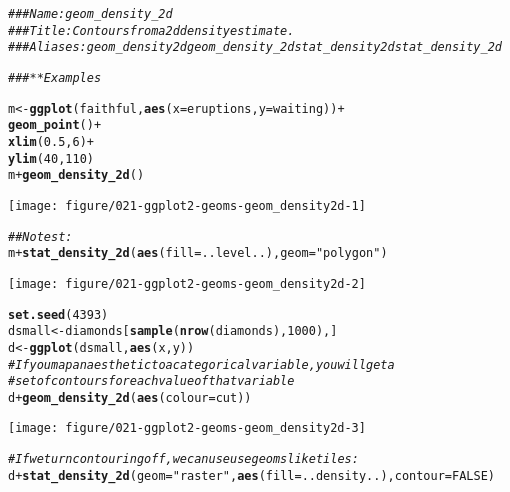 \documentclass[a4paper,titlepage]{tufte-handout}\usepackage[]{graphicx}\usepackage[]{color}
\makeatletter
\def\maxwidth{ %
  \ifdim\Gin@nat@width>\linewidth
    \linewidth
  \else
    \Gin@nat@width
  \fi
}
\newcommand{\hlnum}[1]{\textcolor[rgb]{0.686,0.059,0.569}{#1}}%
\newcommand{\hlstr}[1]{\textcolor[rgb]{0.192,0.494,0.8}{#1}}%
\newcommand{\hlcom}[1]{\textcolor[rgb]{0.678,0.584,0.686}{\textit{#1}}}%
\newcommand{\hlopt}[1]{\textcolor[rgb]{0,0,0}{#1}}%
\newcommand{\hlstd}[1]{\textcolor[rgb]{0.345,0.345,0.345}{#1}}%
\newcommand{\hlkwb}[1]{\textcolor[rgb]{0.69,0.353,0.396}{#1}}%
\newcommand{\hlkwc}[1]{\textcolor[rgb]{0.333,0.667,0.333}{#1}}%
\newcommand{\hlkwd}[1]{\textcolor[rgb]{0.737,0.353,0.396}{\textbf{#1}}}%
\newenvironment{kframe}{%
 \def\at@end@of@kframe{}%
 \ifinner\ifhmode%
  \def\at@end@of@kframe{\end{minipage}}%
  \begin{minipage}{\columnwidth}%
 \fi\fi%
 \def\FrameCommand##1{\hskip\@totalleftmargin \hskip-\fboxsep
 \colorbox{shadecolor}{##1}\hskip-\fboxsep
     \hskip-\linewidth \hskip-\@totalleftmargin \hskip\columnwidth}%
 \MakeFramed {\advance\hsize-\width
   \@totalleftmargin\z@ \linewidth\hsize
   \@setminipage}}%
 {\par\unskip\endMakeFramed%
 \at@end@of@kframe}
\newenvironment{knitrout}{}{} %
\makeatother
\begin{document}
\begin{knitrout}
\color{fgcolor}\begin{kframe}
\begin{alltt}
\hlcom{### Name: geom_density_2d}
\hlcom{### Title: Contours from a 2d density estimate.}
\hlcom{### Aliases: geom_density2d geom_density_2d stat_density2d stat_density_2d}

\hlcom{### ** Examples}

\hlstd{m} \hlkwb{<-} \hlkwd{ggplot}\hlstd{(faithful,} \hlkwd{aes}\hlstd{(}\hlkwc{x} \hlstd{= eruptions,} \hlkwc{y} \hlstd{= waiting))} \hlopt{+}
 \hlkwd{geom_point}\hlstd{()} \hlopt{+}
 \hlkwd{xlim}\hlstd{(}\hlnum{0.5}\hlstd{,} \hlnum{6}\hlstd{)} \hlopt{+}
 \hlkwd{ylim}\hlstd{(}\hlnum{40}\hlstd{,} \hlnum{110}\hlstd{)}
\hlstd{m} \hlopt{+} \hlkwd{geom_density_2d}\hlstd{()}
\end{alltt}
\end{kframe}
\texttt{[image: figure/021-ggplot2-geoms-geom\_density2d-1]} 
\begin{kframe}\begin{alltt}
\hlcom{## No test: }
\hlstd{m} \hlopt{+} \hlkwd{stat_density_2d}\hlstd{(}\hlkwd{aes}\hlstd{(}\hlkwc{fill} \hlstd{= ..level..),} \hlkwc{geom} \hlstd{=} \hlstr{"polygon"}\hlstd{)}
\end{alltt}
\end{kframe}
\texttt{[image: figure/021-ggplot2-geoms-geom\_density2d-2]} 
\begin{kframe}\begin{alltt}
\hlkwd{set.seed}\hlstd{(}\hlnum{4393}\hlstd{)}
\hlstd{dsmall} \hlkwb{<-} \hlstd{diamonds[}\hlkwd{sample}\hlstd{(}\hlkwd{nrow}\hlstd{(diamonds),} \hlnum{1000}\hlstd{), ]}
\hlstd{d} \hlkwb{<-} \hlkwd{ggplot}\hlstd{(dsmall,} \hlkwd{aes}\hlstd{(x, y))}
\hlcom{# If you map an aesthetic to a categorical variable, you will get a}
\hlcom{# set of contours for each value of that variable}
\hlstd{d} \hlopt{+} \hlkwd{geom_density_2d}\hlstd{(}\hlkwd{aes}\hlstd{(}\hlkwc{colour} \hlstd{= cut))}
\end{alltt}
\end{kframe}
\texttt{[image: figure/021-ggplot2-geoms-geom\_density2d-3]} 
\begin{kframe}\begin{alltt}
\hlcom{# If we turn contouring off, we can use use geoms like tiles:}
\hlstd{d} \hlopt{+} \hlkwd{stat_density_2d}\hlstd{(}\hlkwc{geom} \hlstd{=} \hlstr{"raster"}\hlstd{,} \hlkwd{aes}\hlstd{(}\hlkwc{fill} \hlstd{= ..density..),} \hlkwc{contour} \hlstd{=} \hlnum{FALSE}\hlstd{)}

\end{alltt}
\end{kframe}
\end{knitrout}
\end{document}
